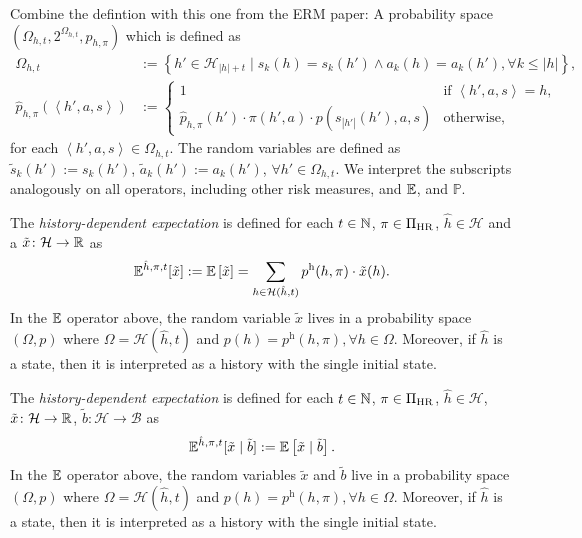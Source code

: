  Combine the defintion with this one from the ERM paper:
A probability space $(\Omega_{h,t}, 2^{\Omega_{h,t} }, \hat{p}_{h,\pi})$ which is defined as
\begin{align}
\label{eq:omega-def}
  \Omega_{h,t} &:= \left\{ h' \in \mathcal{H}_{|h| + t} \mid s_k(h) = s_k(h') \wedge a_k(h) = a_k(h'), \forall k \le |h| \right\}, \\
  \label{eq:phat-def}
\hat{p}_{h,\pi}\left(\left< h', a, s \right>\right)
&:= \begin{cases}
1 &\text{if } \left< h', a, s \right> = h, \\
\hat{p}_{h,\pi}(h') \cdot  \pi(h', a) \cdot p(s_{|h'|}(h'), a, s)
&\text{otherwise},
\end{cases}
\end{align}
for each $\left< h', a, s \right> \in \Omega_{h,t}$. The random variables are defined as $\tilde{s}_k(h') := s_k(h')$, $\tilde{a}_k(h') := a_k(h')$, $\forall h'\in \Omega_{h,t}$. We interpret the subscripts analogously on all operators, including other risk measures, and $\mathbb{E}$, and $\mathbb{P}$.



\begin{definition}\label{def:expect-h}
The \emph{history-dependent expectation} is defined for each $t\in \mathbb{N}$, $\pi\in \Pi_{\mathrm{HR}}$, $\hat{h}\in \mathcal{H}$ and a $\tilde{x}\colon \mathcal{H} \to \mathbb{R}$ as
\begin{equation*}
\mathbb{E}^{\hat{h}, \pi, t} [\tilde{x}]
:= \mathbb{E} \left[ \tilde{x} \right] 
= \sum_{h \in \mathcal{H}(\hat{h}, t)} p^{\mathrm{h}}(h, \pi) \cdot \tilde{x}(h).
\end{equation*}
In the $\mathbb{E}$ operator above, the random variable $\tilde{x}$ lives in a probability space $(\Omega, p)$ where $\Omega = \mathcal{H}(\hat{h}, t)$ and $p(h) = p^{\mathrm{h}}(h, \pi), \forall h\in \Omega$.
Moreover, if $\hat{h}$ is a state, then it is interpreted as a history with the single initial state.
 \leanok
\end{definition}


\begin{definition}\label{def:expect-h-cnd}
The \emph{history-dependent expectation} is defined for each $t\in \mathbb{N}$, $\pi\in \Pi_{\mathrm{HR}}$, $\hat{h}\in \mathcal{H}$, $\tilde{x}\colon \mathcal{H} \to \mathbb{R}$, $\tilde{b}\colon \mathcal{H} \to \mathcal{\mathcal{B}}$ as
\begin{equation*}
\mathbb{E}^{\hat{h}, \pi, t} [\tilde{x} \mid \tilde{b} ]
:= \mathbb{E} \left[ \tilde{x} \mid  \tilde{b} \right].
\end{equation*}
In the $\mathbb{E}$ operator above, the random variables $\tilde{x}$ and $\tilde{b}$ live in a probability space $(\Omega, p)$ where $\Omega = \mathcal{H}(\hat{h}, t)$ and $p(h) = p^{\mathrm{h}}(h, \pi), \forall h\in \Omega$.
Moreover, if $\hat{h}$ is a state, then it is interpreted as a history with the single initial state.
 \leanok
\end{definition}

